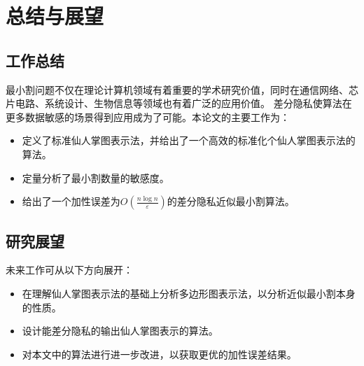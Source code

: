 \chapter{总结与展望}
\section{工作总结}
最小割问题不仅在理论计算机领域有着重要的学术研究价值，同时在通信网络、芯片电路、系统设计、生物信息等领域也有着广泛的应用价值。
差分隐私使算法在更多数据敏感的场景得到应用成为了可能。本论文的主要工作为：
\begin{itemize}
    \item 定义了标准仙人掌图表示法，并给出了一个高效的标准化个仙人掌图表示法的算法。
    \item 定量分析了最小割数量的敏感度。
    \item 给出了一个加性误差为$O(\frac{n\log n}\varepsilon)$的差分隐私近似最小割算法。
\end{itemize}

\section{研究展望}
未来工作可从以下方向展开：
\begin{itemize}
    \item 在理解仙人掌图表示法的基础上分析多边形图表示法，以分析近似最小割本身的性质。
    \item 设计能差分隐私的输出仙人掌图表示的算法。
    \item 对本文中的算法进行进一步改进，以获取更优的加性误差结果。
\end{itemize}
